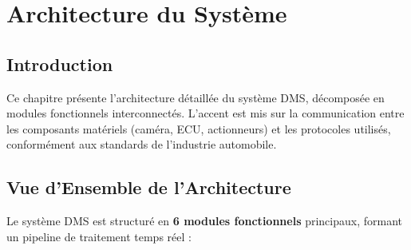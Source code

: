 
\chapter{Architecture du Système}

\section{Introduction}

Ce chapitre présente l'architecture détaillée du système DMS, décomposée en modules fonctionnels interconnectés. L'accent est mis sur la communication entre les composants matériels (caméra, ECU, actionneurs) et les protocoles utilisés, conformément aux standards de l'industrie automobile.

\section{Vue d'Ensemble de l'Architecture}

Le système DMS est structuré en \textbf{6 modules fonctionnels} principaux, formant un pipeline de traitement temps réel :


